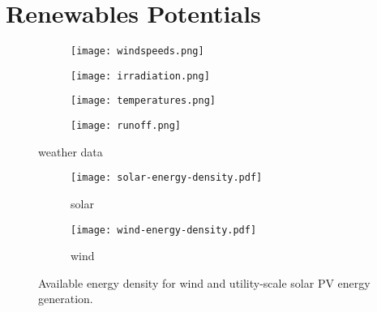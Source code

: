 \section{Renewables Potentials}

\begin{figure}
    \centering
        \begin{subfigure}[t]{0.49\textwidth}
            \centering
        \texttt{[image: windspeeds.png]}
    \end{subfigure}
    \begin{subfigure}[t]{0.49\textwidth}
        \centering
        \texttt{[image: irradiation.png]}
    \end{subfigure}
    \begin{subfigure}[t]{0.49\textwidth}
        \centering
        \texttt{[image: temperatures.png]}
    \end{subfigure}
    \begin{subfigure}[t]{0.49\textwidth}
        \centering
        \texttt{[image: runoff.png]}
    \end{subfigure}
    \caption{weather data}
    \label{fig:weather-data}
\end{figure}


\begin{figure}
    \centering
    \begin{subfigure}[t]{0.49\textwidth}
        \centering
        \caption{solar}
        \texttt{[image: solar-energy-density.pdf]}
    \end{subfigure}
    \begin{subfigure}[t]{0.49\textwidth}
        \centering
        \caption{wind}
        \texttt{[image: wind-energy-density.pdf]}
    \end{subfigure}
    \caption{Available energy density for wind and utility-scale solar PV energy generation.}
    \label{fig:energy-density}
\end{figure}

